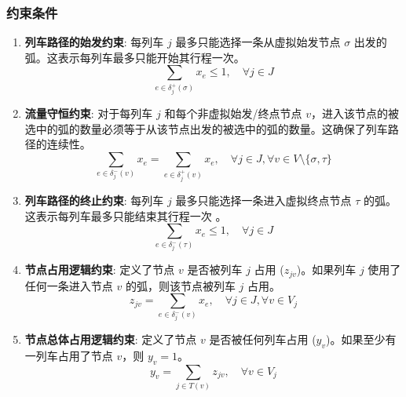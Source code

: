 \documentclass{article}
\begin{document}
\subsubsection{约束条件}
\begin{enumerate}
    \item \textbf{列车路径的始发约束}:
        每列车 $j$ 最多只能选择一条从虚拟始发节点 $\sigma$ 出发的弧。这表示每列车最多只能开始其行程一次。
        \begin{equation}
            \sum_{e \in \delta_j^+(\sigma)} x_e \le 1, \quad \forall
            j \in J\label{eq:con_start}
        \end{equation}

    \item \textbf{流量守恒约束}:
        对于每列车 $j$ 和每个非虚拟始发/终点节点
        $v$，进入该节点的被选中的弧的数量必须等于从该节点出发的被选中的弧的数量。这确保了列车路径的连续性。
        \begin{equation}
            \sum_{e \in \delta_j^-(v)} x_e = \sum_{e \in
            \delta_j^+(v)} x_e, \quad \forall j \in J, \forall v \in
            V \setminus \{\sigma, \tau\}\label{eq:con_flow}
        \end{equation}

    \item \textbf{列车路径的终止约束}:
        每列车 $j$ 最多只能选择一条进入虚拟终点节点 $\tau$ 的弧。这表示每列车最多只能结束其行程一次 。
        \begin{equation}
            \sum_{e \in \delta_j^-(\tau)} x_e \le 1, \quad \forall j
            \in J\label{eq:con_end}
        \end{equation}

    \item \textbf{节点占用逻辑约束}:
        定义了节点 $v$ 是否被列车 $j$ 占用 ($z_{jv}$)。如果列车 $j$ 使用了任何一条进入节点 $v$
        的弧，则该节点被列车 $j$ 占用。
        \begin{equation}
            z_{jv} = \sum_{e \in \delta_j^-(v)} x_e, \quad \forall j
            \in J, \forall v \in V_j\label{eq:con_node_occupied}
        \end{equation}

    \item \textbf{节点总体占用逻辑约束}:
        定义了节点 $v$ 是否被任何列车占用 ($y_v$)。如果至少有一列车占用了节点 $v$，则 $y_v=1$。
        \begin{equation}
            y_v = \sum_{j \in T(v)} z_{jv}, \quad \forall v \in
            V_j\label{eq:con_node_occupied_total}
        \end{equation}


\end{enumerate}
\end{document}
